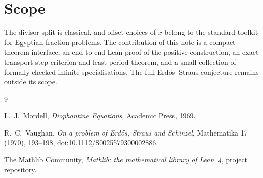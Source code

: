 \documentclass[11pt]{article}
\theoremstyle{remark}
\begin{document}
\section{Scope}

The divisor split is classical, and offset choices of \(x\) belong to the
standard toolkit for Egyptian-fraction problems.  The contribution of this note
is a compact theorem interface, an end-to-end Lean proof of the positive
construction, an exact transport-step criterion and least-period theorem, and a
small collection of formally checked infinite specialisations.  The full
Erdős--Straus conjecture remains outside its scope.

\begin{thebibliography}{9}

L.~J.~Mordell,
\emph{Diophantine Equations},
Academic Press, 1969.

R.~C.~Vaughan,
\emph{On a problem of Erdős, Straus and Schinzel},
Mathematika 17 (1970), 193--198,
\href{https://doi.org/10.1112/S0025579300002886}{doi:10.1112/S0025579300002886}.

The Mathlib Community,
\emph{Mathlib: the mathematical library of Lean~4},
\href{https://github.com/leanprover-community/mathlib4}{project repository}.

\end{thebibliography}
\end{document}
